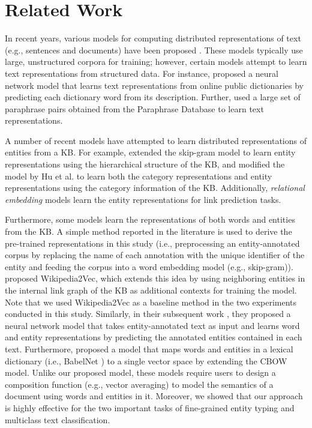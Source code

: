 \documentclass[11pt]{article}
\begin{document}
  \section{Related Work}
  In recent years, various models for computing distributed representations of text (e.g., sentences and documents) have been proposed \cite{DBLP:conf/icml/LeM14,NIPS2015_5950,Wieting2015,TACL711}.
  These models typically use large, unstructured corpora for training; however, certain models attempt to learn text representations from structured data.
  For instance,  proposed a neural network model that learns text representations from online public dictionaries by predicting each dictionary word from its description.
  Further,  used a large set of paraphrase pairs obtained from the Paraphrase Database \cite{ganitkevitch-vandurme-callisonburch:2013:NAACL-HLT} to learn text representations.

  A number of recent models have attempted to learn distributed representations of entities from a KB.
  For example,  extended the skip-gram model \cite{Mikolov2013} to learn entity representations using the hierarchical structure of the KB, and  modified the model by Hu et al. to learn both the category representations and entity representations using the category information of the KB.
  Additionally, \textit{relational embedding} models \cite{Bordes2013,wang-EtAl:2014:EMNLP20145,AAAI159571} learn the entity representations for link prediction tasks.

  Furthermore, some models learn the representations of both words and entities from the KB.
  A simple method reported in the literature \cite{yaghoobzadeh-schutze:2015:EMNLP,TACL1065} is used to derive the pre-trained representations in this study (i.e., preprocessing an entity-annotated corpus by replacing the name of each annotation with the unique identifier of the entity and feeding the corpus into a word embedding model (e.g., skip-gram)).
   proposed Wikipedia2Vec, which extends this idea by using neighboring entities in the internal link graph of the KB as additional contexts for training the model.
  Note that we used Wikipedia2Vec as a baseline method in the two experiments conducted in this study.
  Similarly, in their subsequent work \cite{TACL1065}, they proposed a neural network model that takes entity-annotated text as input and learns word and entity representations by predicting the annotated entities contained in each text.
  Furthermore,  proposed a model that maps words and entities in a lexical dictionary (i.e., BabelNet \cite{NAVIGLI2012217}) to a single vector space by extending the CBOW model.
  Unlike our proposed model, these models require users to design a composition function (e.g., vector averaging) to model the semantics of a document using words and entities in it.
  Moreover, we showed that our approach is highly effective for the two important tasks of fine-grained entity typing and multiclass text classification.
\end{document}

